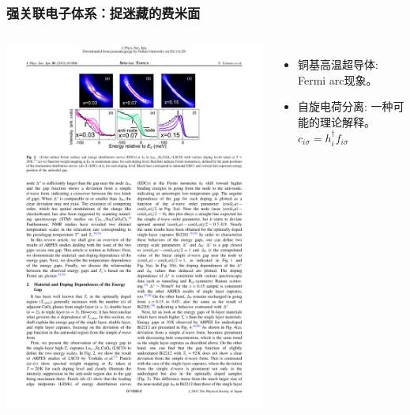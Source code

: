 \documentclass[xcolor=table, 10pt, aspectratio=169]{beamer}
\begin{document}
\begin{frame}
	\frametitle{强关联电子体系：捉迷藏的费米面}
	\begin{columns}
		\includegraphics{arc_arpes}
		\begin{itemize}
			\item 铜基高温超导体: Fermi arc现象。
			\vspace{3em}
			\item 自旋电荷分离: 一种可能的理论解释。
			$c_{i\sigma} = h_i^\dagger f_{i\sigma}$
		\end{itemize}
	\end{columns}
\end{frame}
\end{document}
